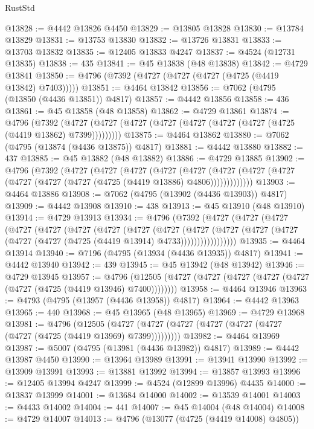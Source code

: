 \begin{lexlean}{RustStd}
\begin{coremodule}
@13828 := @4442 @13826 @4450
@13829 := @13805 @13828
@13830 := @13784 @13829
@13831 := @13753 @13830
@13832 := @13726 @13831
@13833 := @13703 @13832
@13835 := @12405 @13833 @4247
@13837 := @4524 (@12731 @13835)
@13838 := 435
@13841 := @45 @13838 (@48 @13838)
@13842 := @4729 @13841
@13850 := @4796 (@7392 (@4727 (@4727 (@4727 (@4725 (@4419 @13842) @7403)))))
@13851 := @4464 @13842
@13856 := @7062 (@4795 (@13850 (@4436 @13851)) @4817)
@13857 := @4442 @13856
@13858 := 436
@13861 := @45 @13858 (@48 @13858)
@13862 := @4729 @13861
@13874 := @4796
    (@7392 (@4727 (@4727 (@4727 (@4727 (@4727 (@4727 (@4727 (@4725 (@4419 @13862) @7399)))))))))
@13875 := @4464 @13862
@13880 := @7062 (@4795 (@13874 (@4436 @13875)) @4817)
@13881 := @4442 @13880
@13882 := 437
@13885 := @45 @13882 (@48 @13882)
@13886 := @4729 @13885
@13902 := @4796
    (@7392
      (@4727
        (@4727
          (@4727
            (@4727
              (@4727
                (@4727 (@4727 (@4727 (@4727 (@4727 (@4727 (@4725 (@4419 @13886) @4806)))))))))))))
@13903 := @4464 @13886
@13908 := @7062 (@4795 (@13902 (@4436 @13903)) @4817)
@13909 := @4442 @13908
@13910 := 438
@13913 := @45 @13910 (@48 @13910)
@13914 := @4729 @13913
@13934 := @4796
    (@7392
      (@4727
        (@4727
          (@4727
            (@4727
              (@4727
                (@4727
                  (@4727
                    (@4727
                      (@4727
                        (@4727
                          (@4727
                            (@4727 (@4727 (@4727 (@4727 (@4725 (@4419 @13914) @4733)))))))))))))))))
@13935 := @4464 @13914
@13940 := @7196 (@4795 (@13934 (@4436 @13935)) @4817)
@13941 := @4442 @13940
@13942 := 439
@13945 := @45 @13942 (@48 @13942)
@13946 := @4729 @13945
@13957 := @4796
    (@12505 (@4727 (@4727 (@4727 (@4727 (@4727 (@4727 (@4725 (@4419 @13946) @7400))))))))
@13958 := @4464 @13946
@13963 := @4793 (@4795 (@13957 (@4436 @13958)) @4817)
@13964 := @4442 @13963
@13965 := 440
@13968 := @45 @13965 (@48 @13965)
@13969 := @4729 @13968
@13981 := @4796
    (@12505 (@4727 (@4727 (@4727 (@4727 (@4727 (@4727 (@4727 (@4725 (@4419 @13969) @7399)))))))))
@13982 := @4464 @13969
@13987 := @5007 (@4795 (@13981 (@4436 @13982)) @4817)
@13989 := @4442 @13987 @4450
@13990 := @13964 @13989
@13991 := @13941 @13990
@13992 := @13909 @13991
@13993 := @13881 @13992
@13994 := @13857 @13993
@13996 := @12405 @13994 @4247
@13999 := @4524 (@12899 @13996) @4435
@14000 := @13837 @13999
@14001 := @13684 @14000
@14002 := @13539 @14001
@14003 := @4433 @14002
@14004 := 441
@14007 := @45 @14004 (@48 @14004)
@14008 := @4729 @14007
@14013 := @4796 (@13077 (@4725 (@4419 @14008) @4805))

\end{coremodule}
\end{lexlean}
